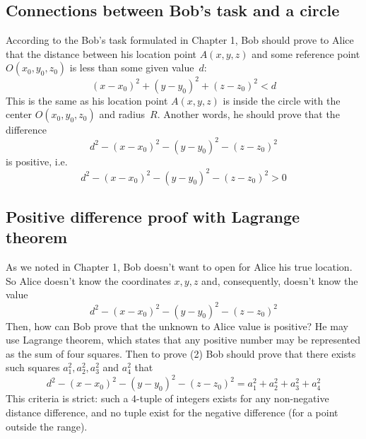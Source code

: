 \documentclass{article}
\begin{document}
\subsection{Connections between Bob’s task and a circle}  %
According to the Bob’s task formulated in Chapter 1,
Bob should prove to Alice that the distance between his location point $A(x, y, z)$  
and some reference point $O(x_0, y_0, z_0)$ is less than some given value~$d$:
\begin{equation}
  (x - x_0)^2 + (y - y_0)^2 + (z - z_0)^2 < d
\end{equation}
This is the same as his location point $A(x, y, z)$ is inside the circle with the center $O(x_0, y_0, z_0)$ and radius~$R$.
Another words, he should prove that the difference
\begin{equation}
  d^2 - (x - x_0)^2 - (y - y_0)^2 - (z - z_0)^2
\end{equation}
is positive, i.e.
\begin{equation}
  d^2 - (x - x_0)^2 - (y - y_0)^2 - (z - z_0)^2 > 0
\end{equation}

\subsection{Positive difference proof with Lagrange theorem}  %
As we noted in Chapter 1, Bob doesn’t want to open for Alice his true location.
So Alice doesn’t know the coordinates $x, y, z$ and, consequently, doesn’t know the value
\begin{equation}
  d^2 - (x - x_0)^2 - (y - y_0)^2 - (z - z_0)^2
\end{equation}
Then, how can Bob prove that the unknown to Alice value is positive?
He may use Lagrange theorem, which states that any positive number may be represented as the sum of four squares.
Then to prove (2) Bob should prove that there exists such squares $a_1^2, a_2^2, a_3^2$ and $a_4^2$ that
\begin{equation}
  d^2 - (x - x_0)^2 - (y - y_0)^2 - (z - z_0)^2 = a_1^2 + a_2^2 + a_3^2 + a_4^2
\end{equation}
This criteria is strict: such a 4-tuple of integers exists for any non-negative distance difference,
and no tuple exist for the negative difference (for a point outside the range).
\end{document}

